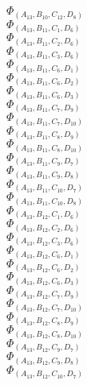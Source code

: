 \documentclass[14pt]{article}
\begin{document}
    $\Phi_{({A}_{13}, {B}_{10}, {C}_{12}, {D}_{8})}$ \\ 
    $\Phi_{({A}_{13}, {B}_{11}, {C}_{1}, {D}_{6})}$ \\ 
    $\Phi_{({A}_{13}, {B}_{11}, {C}_{2}, {D}_{6})}$ \\ 
    $\Phi_{({A}_{13}, {B}_{11}, {C}_{3}, {D}_{6})}$ \\ 
    $\Phi_{({A}_{13}, {B}_{11}, {C}_{6}, {D}_{1})}$ \\ 
    $\Phi_{({A}_{13}, {B}_{11}, {C}_{6}, {D}_{2})}$ \\ 
    $\Phi_{({A}_{13}, {B}_{11}, {C}_{6}, {D}_{3})}$ \\ 
    $\Phi_{({A}_{13}, {B}_{11}, {C}_{7}, {D}_{9})}$ \\ 
    $\Phi_{({A}_{13}, {B}_{11}, {C}_{7}, {D}_{10})}$ \\ 
    $\Phi_{({A}_{13}, {B}_{11}, {C}_{8}, {D}_{9})}$ \\ 
    $\Phi_{({A}_{13}, {B}_{11}, {C}_{8}, {D}_{10})}$ \\ 
    $\Phi_{({A}_{13}, {B}_{11}, {C}_{9}, {D}_{7})}$ \\ 
    $\Phi_{({A}_{13}, {B}_{11}, {C}_{9}, {D}_{8})}$ \\ 
    $\Phi_{({A}_{13}, {B}_{11}, {C}_{10}, {D}_{7})}$ \\ 
    $\Phi_{({A}_{13}, {B}_{11}, {C}_{10}, {D}_{8})}$ \\ 
    $\Phi_{({A}_{13}, {B}_{12}, {C}_{1}, {D}_{6})}$ \\ 
    $\Phi_{({A}_{13}, {B}_{12}, {C}_{2}, {D}_{6})}$ \\ 
    $\Phi_{({A}_{13}, {B}_{12}, {C}_{3}, {D}_{6})}$ \\ 
    $\Phi_{({A}_{13}, {B}_{12}, {C}_{6}, {D}_{1})}$ \\ 
    $\Phi_{({A}_{13}, {B}_{12}, {C}_{6}, {D}_{2})}$ \\ 
    $\Phi_{({A}_{13}, {B}_{12}, {C}_{6}, {D}_{3})}$ \\ 
    $\Phi_{({A}_{13}, {B}_{12}, {C}_{7}, {D}_{9})}$ \\ 
    $\Phi_{({A}_{13}, {B}_{12}, {C}_{7}, {D}_{10})}$ \\ 
    $\Phi_{({A}_{13}, {B}_{12}, {C}_{8}, {D}_{9})}$ \\ 
    $\Phi_{({A}_{13}, {B}_{12}, {C}_{8}, {D}_{10})}$ \\ 
    $\Phi_{({A}_{13}, {B}_{12}, {C}_{9}, {D}_{7})}$ \\ 
    $\Phi_{({A}_{13}, {B}_{12}, {C}_{9}, {D}_{8})}$ \\ 
    $\Phi_{({A}_{13}, {B}_{12}, {C}_{10}, {D}_{7})}$ \\ 
\end{document}
